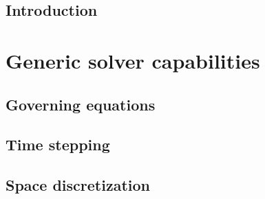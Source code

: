 \documentclass[a4paper,10pt,twoside]{csdoc}
\begin{document}
\def\contentsname{\textbf{\normalsize Table of contents}\pdfbookmark[1]{Contents}{contents}}

\renewcommand{\logocs}{cs_logo_black}

\large
\makepdgCS
\normalsize

\passepage


\passepart
\begin{center}\begin{singlespace}
\tableofcontents
\end{singlespace}\end{center}


%
\passepage

\printnomenclature
%
\chapter{Introduction}




\part{Generic solver capabilities}
\setcounter{section}{0}
\setcounter{equation}{0}
\setcounter{figure}{0}

\chapter{Governing equations}\label{chapter:goveqn}


\chapter{Time stepping}\label{chapter:timstp}


\chapter{Space discretization}\label{chapter:spadis}

\end{document}
